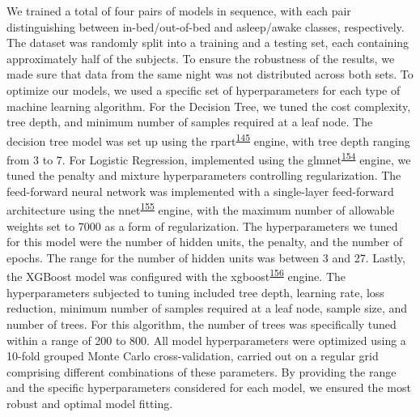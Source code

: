 \documentclass[
  10pt,
]{scrbook}
\begin{document}
We trained a total of four pairs of models in sequence, with each pair
distinguishing between in-bed/out-of-bed and asleep/awake classes,
respectively. The dataset was randomly split into a training and a
testing set, each containing approximately half of the subjects. To
ensure the robustness of the results, we made sure that data from the
same night was not distributed across both sets. To optimize our models,
we used a specific set of hyperparameters for each type of machine
learning algorithm. For the Decision Tree, we tuned the cost complexity,
tree depth, and minimum number of samples required at a leaf node. The
decision tree model was set up using the
rpart\textsuperscript{\protect\hyperlink{ref-rpart}{145}} engine, with
tree depth ranging from 3 to 7. For Logistic Regression, implemented
using the
glmnet\textsuperscript{\protect\hyperlink{ref-friedman_glmnet_2010}{154}}
engine, we tuned the penalty and mixture hyperparameters controlling
regularization. The feed-forward neural network was implemented with a
single-layer feed-forward architecture using the
nnet\textsuperscript{\protect\hyperlink{ref-nnet}{155}} engine, with the
maximum number of allowable weights set to 7000 as a form of
regularization. The hyperparameters we tuned for this model were the
number of hidden units, the penalty, and the number of epochs. The range
for the number of hidden units was between 3 and 27. Lastly, the XGBoost
model was configured with the
xgboost\textsuperscript{\protect\hyperlink{ref-xgboost}{156}} engine.
The hyperparameters subjected to tuning included tree depth, learning
rate, loss reduction, minimum number of samples required at a leaf node,
sample size, and number of trees. For this algorithm, the number of
trees was specifically tuned within a range of 200 to 800. All model
hyperparameters were optimized using a 10-fold grouped Monte Carlo
cross-validation, carried out on a regular grid comprising different
combinations of these parameters. By providing the range and the
specific hyperparameters considered for each model, we ensured the most
robust and optimal model fitting.
\end{document}
